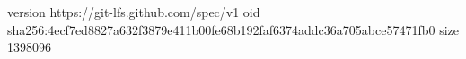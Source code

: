 version https://git-lfs.github.com/spec/v1
oid sha256:4ecf7ed8827a632f3879e411b00fe68b192faf6374addc36a705abce57471fb0
size 1398096
